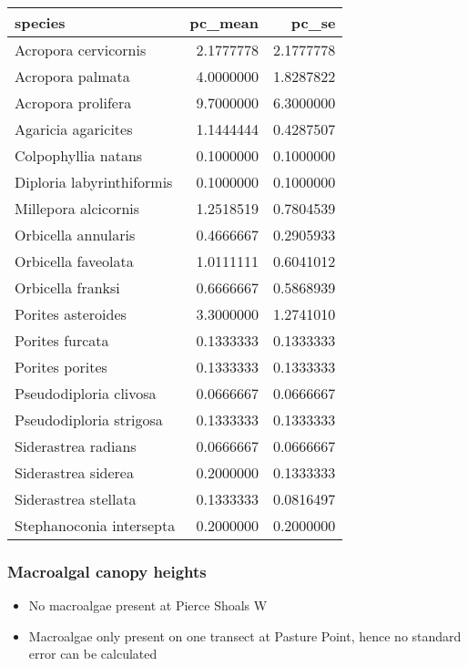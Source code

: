 \documentclass[
]{article}
\providecommand{\tightlist}{%
  \setlength{\itemsep}{0pt}\setlength{\parskip}{0pt}}
\begin{document}
\begin{longtable}[]{@{}lrr@{}}
\toprule()
species & pc\_mean & pc\_se \\
\midrule()
\endhead
Acropora cervicornis & 2.1777778 & 2.1777778 \\
Acropora palmata & 4.0000000 & 1.8287822 \\
Acropora prolifera & 9.7000000 & 6.3000000 \\
Agaricia agaricites & 1.1444444 & 0.4287507 \\
Colpophyllia natans & 0.1000000 & 0.1000000 \\
Diploria labyrinthiformis & 0.1000000 & 0.1000000 \\
Millepora alcicornis & 1.2518519 & 0.7804539 \\
Orbicella annularis & 0.4666667 & 0.2905933 \\
Orbicella faveolata & 1.0111111 & 0.6041012 \\
Orbicella franksi & 0.6666667 & 0.5868939 \\
Porites asteroides & 3.3000000 & 1.2741010 \\
Porites furcata & 0.1333333 & 0.1333333 \\
Porites porites & 0.1333333 & 0.1333333 \\
Pseudodiploria clivosa & 0.0666667 & 0.0666667 \\
Pseudodiploria strigosa & 0.1333333 & 0.1333333 \\
Siderastrea radians & 0.0666667 & 0.0666667 \\
Siderastrea siderea & 0.2000000 & 0.1333333 \\
Siderastrea stellata & 0.1333333 & 0.0816497 \\
Stephanoconia intersepta & 0.2000000 & 0.2000000 \\
\bottomrule()
\end{longtable}

\hypertarget{macroalgal-canopy-heights}{%
\subsubsection{Macroalgal canopy
heights}\label{macroalgal-canopy-heights}}

\begin{itemize}
\tightlist
\item
  No macroalgae present at Pierce Shoals W
\item
  Macroalgae only present on one transect at Pasture Point, hence no
  standard error can be calculated
\end{itemize}
\end{document}

